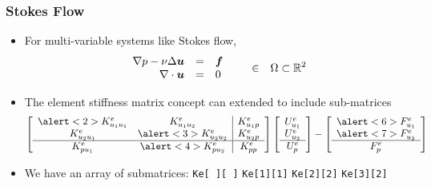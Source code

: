 \begin{frame}[t]  %
  \frametitle{Stokes Flow}
  \begin{block}{}
    \begin{itemize}    
    \item{For multi-variable systems like Stokes flow,
      \begin{equation}
	\begin{array}{rcl}
	  \nonumber
	  \nabla p - \nu \Delta {\boldsymbol{u}}  &=& {\boldsymbol{f}}
	  \\
	  \nonumber
	  \nabla \cdot {\boldsymbol{u}} &=& 0
	\end{array}  \hspace{.25in}  \in \hspace{.1in} \Omega \subset \mathbb{R}^2
      \end{equation}
    }
\vspace{-.25in}
      
    \item{The element stiffness matrix concept can extended to include sub-matrices
      \begin{eqnarray}
	\nonumber
	\label{eqn:Ke_stokes}
	\left[
	  \begin{array}{cc|c}
	    \alert<2>{K^e_{u_1 u_1}}   & K^e_{u_1 u_2}             &  K^e_{u_1 p}        \\
	    K^e_{u_2 u_1}              & \alert<3>{K^e_{u_2 u_2}}  &  K^e_{u_2 p} \\ \hline
	    K^e_{p u_1}                & \alert<4>{K^e_{p u_2}}    &  K^e_{p p}      \\
	  \end{array}
	  \right]
	\left[
  \begin{array}{c}
    U^e_{u_1} \\
    U^e_{u_2}\\ \hline
    U^e_{p}
  \end{array}
  \right]-
\left[
  \begin{array}{c}
    \alert<6>{F^e_{u_{1}}} \\
    \alert<7>{F^e_{u_{2}}} \\ \hline
    F^e_{p}
  \end{array}
  \right]
      \end{eqnarray}
    }


      \item
	{
	  	      {We have an array of submatrices:}
	      	      {\texttt{Ke[ ][ ]}}
	      	      {\hspace{-0.05in}\texttt{Ke[\alert<2>{1}][\alert<2>{1}]}}
	      	      {\hspace{-0.1in}\texttt{Ke[\alert<3>{2}][\alert<3>{2}]}}
	              {\hspace{-0.15in}\texttt{Ke[\alert<4>{3}][\alert<4>{2}]}}

}
\end{itemize}
\end{block}
\end{frame}
